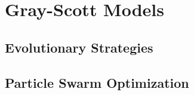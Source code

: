 \chapter{Gray-Scott Models}

\section{Evolutionary Strategies}

\section{Particle Swarm Optimization}